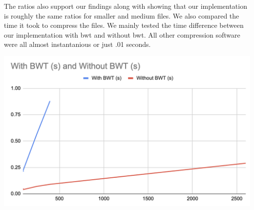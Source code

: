 \documentclass[12pt,letterpaper]{article}
\begin{document}
The ratios also support our findings along with showing that our implementation is roughly the same ratios for smaller and medium files.
We also compared the time it took to compress the files. 
We mainly tested the time difference between our implementation with bwt and without bwt.
All other compression software were all almost instantanious or just .01 seconds.
\begin{table}[h]
    \caption{Compression Time}
\end{table}

\begin{center}
    \includegraphics[scale=.5]{images/time.png}
\end{center}
\end{document}
